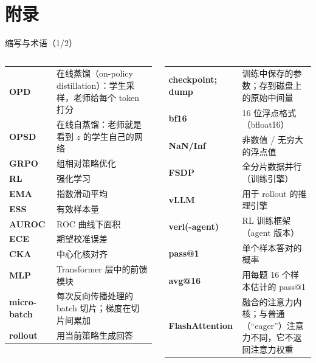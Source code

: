 \documentclass[aspectratio=169,11pt]{beamer}
\begin{document}
\section{附录}

\begin{frame}{缩写与术语（1/2）}
\scriptsize
\setlength{\tabcolsep}{4pt}\renewcommand{\arraystretch}{1.15}
\begin{columns}[T]
\begin{tabularx}{\linewidth}{@{}>{\bfseries}l Y@{}}
\toprule
OPD & 在线蒸馏（on-policy distillation）：学生采样，老师给每个 token 打分\\
OPSD & 在线自蒸馏：老师就是看到 $z$ 的学生自己的网络\\
GRPO & 组相对策略优化\\
RL & 强化学习\\
EMA & 指数滑动平均\\
ESS & 有效样本量\\
AUROC & ROC 曲线下面积\\
ECE & 期望校准误差\\
CKA & 中心化核对齐\\
MLP & Transformer 层中的前馈模块\\
micro-batch & 每次反向传播处理的 batch 切片；梯度在切片间累加\\
rollout & 用当前策略生成回答\\
\bottomrule
\end{tabularx}
\begin{tabularx}{\linewidth}{@{}>{\bfseries}l Y@{}}
\toprule
checkpoint; dump & 训练中保存的参数；存到磁盘上的原始中间量\\
bf16 & 16 位浮点格式（bfloat16）\\
NaN/Inf & 非数值 / 无穷大的浮点值\\
FSDP & 全分片数据并行（训练引擎）\\
vLLM & 用于 rollout 的推理引擎\\
verl(-agent) & RL 训练框架（agent 版本）\\
pass@1 & 单个样本答对的概率\\
avg@16 & 用每题 16 个样本估计的 pass@1\\
FlashAttention & 融合的注意力内核；与普通（“eager”）注意力不同，它不返回注意力权重\\
\bottomrule
\end{tabularx}
\end{columns}
\end{frame}
\end{document}
